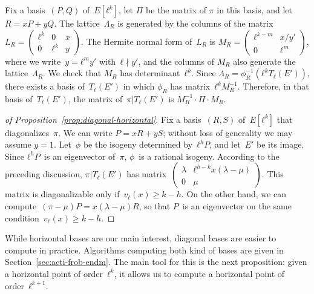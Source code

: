 \documentclass{lms}
\def\mat#1{\begin{pmatrix}#1\end{pmatrix}}
\def\smat#1{{\def\arraystretch{.7}\mat{#1}}}
\begin{document}
Fix a basis~$(P, Q)$ of~$E[ℓ^k]$, let $Π$ be the matrix of $π$
in this basis, and let~$R = x P + y Q$.
The lattice~$Λ_R$ is generated by the columns of the matrix
$L_R = \left (\begin{smallmatrix}ℓ^k & 0 & x\\0 & ℓ^k & y\end{smallmatrix} \right )$.
The Hermite normal form of~$L_R$
is 
$M_R = \left (\begin{smallmatrix}ℓ^{k-m} & x/y' \\ 0 & ℓ^m\end{smallmatrix}\right )$,
where we write~$y = ℓ^m y'$ with~$ℓ ∤y'$,
and the columns of $M_R$ also generate the lattice~$Λ_R$.
We check that $M_R$ has determinant~$ℓ^k$.
Since $Λ_R = ϕ_R^{-1} (ℓ^k T_{ℓ} (E'))$,
there exists a basis of~$T_ℓ(E')$
in which $ϕ_R$ has matrix~$ℓ^k M_R^{-1}$.
Therefore, in that basis of~$T_ℓ(E')$,
the matrix of~$π|T_ℓ(E')$ is $M_R^{-1} · Π · M_R^{}$.
\begin{proof}[of Proposition~\ref{prop:diagonal-horizontal}]
Fix a basis~$(R, S)$ of~$E[ℓ^k]$ that diagonalizes~$π$.
We can write $P = x R + y S$;
without loss of generality we may assume $y=1$.
Let~$ϕ$ be the isogeny determined by~$ℓ^h P$, and let~$E'$ be its image.
Since $ℓ^h P$~is an eigenvector of~$π$, $ϕ$~is a rational isogeny.
According to the preceding discussion,
$π|T_ℓ(E')$ has matrix~$\left ( \begin{smallmatrix}λ& ℓ^{h-k} x (λ-μ)\\ 0&μ
\end{smallmatrix}\right )$.
This matrix is diagonalizable only if~$v_{ℓ}(x) ≥ k - h$.
On the other hand, we can compute~$(π - μ) P = x (λ - μ) R$,
so that $P$~is an eigenvector on the same condition~$v_{ℓ}(x) ≥ k-h$.
\end{proof}

While horizontal bases are our main interest,
diagonal bases are easier to compute in practice.
Algorithms computing both kind of bases
are given in Section~\ref{sec:acti-frob-endm}.
The main tool for this is the next proposition:
given a horizontal point of order~$ℓ^k$,
it allows us to compute a horizontal point of order~$ℓ^{k+1}$.
\end{document}
